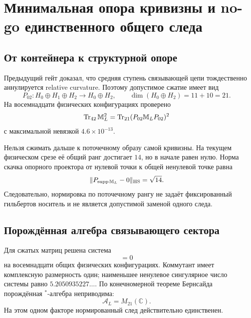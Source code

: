 \chapter{Минимальная опора кривизны и no-go единственного общего следа}
\label{ch:v7-minimal-curvature-support-trace-gate}

\section{От контейнера к структурной опоре}

Предыдущий гейт доказал, что средняя ступень связывающей цепи
тождественно аннулируется relative curvature. Поэтому допустимое сжатие
имеет вид
\begin{equation}
 P_{02}:H_0\oplus H_1\oplus H_2\longrightarrow H_0\oplus H_2,
 \qquad \dim(H_0\oplus H_2)=11+10=21.
\end{equation}
На восемнадцати физических конфигурациях проверено
\begin{equation}
 \operatorname{Tr}_{42}\mathbb M_L^2
 =\operatorname{Tr}_{21}(P_{02}\mathbb M_LP_{02})^2
 \label{eq:v7-support-trace-compression}
\end{equation}
с максимальной невязкой $4.6\times10^{-13}$.

Нельзя сжимать дальше к поточечному образу самой кривизны. На текущем
физическом срезе её общий ранг достигает $14$, но в начале равен нулю.
Норма скачка опорного проектора от нулевой точки к общей ненулевой точке
равна
\begin{equation}
 \|P_{\operatorname{supp}\mathbb M_L}-0\|_{\rm HS}=\sqrt{14}.
 \label{eq:v7-support-projector-jump}
\end{equation}
Следовательно, нормировка по поточечному рангу не задаёт фиксированный
гильбертов носитель и не является допустимой заменой одного следа.

\section{Порождённая алгебра связывающего сектора}

Для сжатых матриц решена система
\begin{equation}
 [X,P_{02}\mathbb M_L(A)P_{02}]=0
\end{equation}
на восемнадцати общих физических конфигурациях. Коммутант имеет комплексную
размерность один; наименьшее ненулевое сингулярное число системы равно
$5.2050935227\ldots$. По конечномерной теореме Бернсайда порождённая
${}^*$-алгебра неприводима:
\begin{equation}
 \mathcal A_L=M_{21}(\mathbb C).
 \label{eq:v7-support-linking-factor}
\end{equation}
На этом одном факторе нормированный след действительно единственен.

